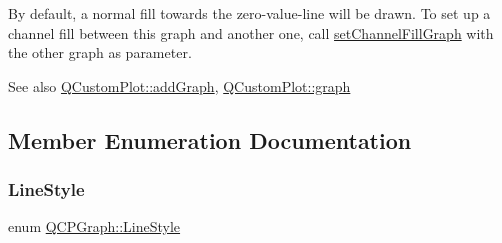By default, a normal fill towards the zero-\/value-\/line will be drawn. To set up a channel fill between this graph and another one, call \hyperlink{classQCPGraph_a2d03156df1b64037a2e36cfa50351ca3}{set\+Channel\+Fill\+Graph} with the other graph as parameter.

\begin{DoxySeeAlso}{See also}
\hyperlink{classQCustomPlot_a6fb2873d35a8a8089842d81a70a54167}{Q\+Custom\+Plot\+::add\+Graph}, \hyperlink{classQCustomPlot_a6ecae130f684b25276fb47bd3a5875c6}{Q\+Custom\+Plot\+::graph} 
\end{DoxySeeAlso}


\subsection{Member Enumeration Documentation}
\mbox{\label{classQCPGraph_ad60175cd9b5cac937c5ee685c32c0859}} 
\subsubsection{\texorpdfstring{Line\+Style}{LineStyle}}
{\footnotesize\ttfamily enum \hyperlink{classQCPGraph_ad60175cd9b5cac937c5ee685c32c0859}{Q\+C\+P\+Graph\+::\+Line\+Style}}

